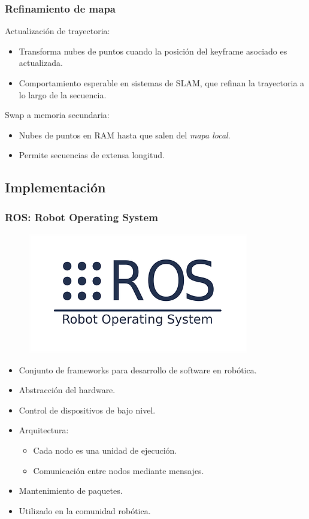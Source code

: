 \documentclass[compress]{beamer}
\begin{document}
\begin{frame}
	\frametitle{Refinamiento de mapa}
	
	Actualización de trayectoria:
	\begin{itemize}
		\item Transforma nubes de puntos cuando la posición del keyframe asociado es actualizada.
		\item Comportamiento esperable en sistemas de SLAM, que refinan la trayectoria a lo largo de la secuencia.
	\end{itemize}

	\vspace{2em}
	\pause{}
	Swap a memoria secundaria:
	\begin{itemize}
		\item Nubes de puntos en RAM hasta que salen del \emph{mapa local}.
		\item Permite secuencias de extensa longitud.
	\end{itemize}

\end{frame}


\subsection{Implementación}


\begin{frame}
	\frametitle{ROS: Robot Operating System}
    \begin{figure}[htb]
        \centering
        \includegraphics[width=0.55\columnwidth]{method/ros.png}
    \end{figure}
	\vspace{-2em}
    \begin{itemize}
 		\item Conjunto de frameworks para desarrollo de software en robótica.
        \item Abstracción del hardware.
        \item Control de dispositivos de bajo nivel.
        \item Arquitectura:
            \begin{itemize}
	        	\item Cada nodo es una unidad de ejecución.
	        	\item Comunicación entre nodos mediante mensajes.
	        \end{itemize}
        \item Mantenimiento de paquetes.
        \item Utilizado en la comunidad robótica.
    \end{itemize}
\end{frame}
\end{document}
